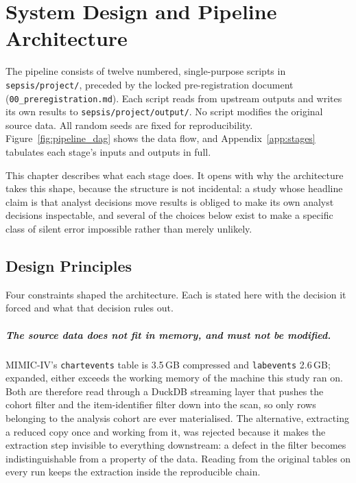 \chapter{System Design and Pipeline Architecture}
\label{ch:design}

The pipeline consists of twelve numbered, single-purpose scripts in
\texttt{sepsis/project/}, preceded by the locked pre-registration document
(\texttt{00\_preregistration.md}). Each script reads from upstream outputs and
writes its own results to \texttt{sepsis/project/output/}. No script modifies the
original source data. All random seeds are fixed for reproducibility.
Figure~\ref{fig:pipeline_dag} shows the data flow, and
Appendix~\ref{app:stages} tabulates each stage's inputs and outputs in full.

This chapter describes what each stage does. It opens with why the architecture
takes this shape, because the structure is not incidental: a study whose
headline claim is that analyst decisions move results is obliged to make its own
analyst decisions inspectable, and several of the choices below exist to make a
specific class of silent error impossible rather than merely unlikely.


\section{Design Principles}
\label{sec:design_principles}

Four constraints shaped the architecture. Each is stated here with the decision
it forced and what that decision rules out.

\paragraph{The source data does not fit in memory, and must not be modified.}
MIMIC-IV's \texttt{chartevents} table is 3.5\,GB compressed and
\texttt{labevents} 2.6\,GB; expanded, either exceeds the working memory of the
machine this study ran on. Both are therefore read through a DuckDB streaming
layer that pushes the cohort filter and the item-identifier filter down into the
scan, so only rows belonging to the analysis cohort are ever materialised. The
alternative, extracting a reduced copy once and working from it, was
rejected because it makes the extraction step invisible to everything
downstream: a defect in the filter becomes indistinguishable from a property of
the data. Reading from the original tables on every run keeps the extraction
inside the reproducible chain.

